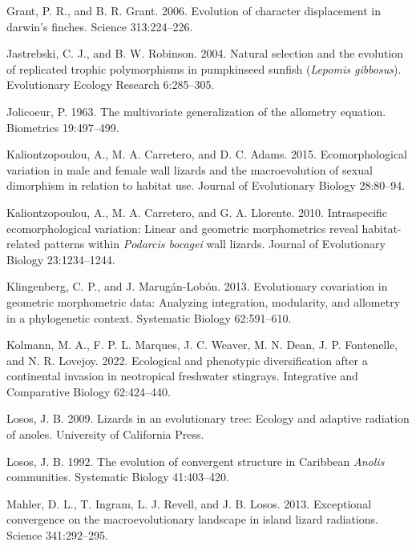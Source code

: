\documentclass[
  11pt,
]{article}
\newlength{\cslhangindent}
\newlength{\cslentryspacingunit} %
\newenvironment{CSLReferences}[2] %
 {%
  \setlength{\parindent}{0pt}
  \ifodd #1
  \let\oldpar\par
  \def\par{\hangindent=\cslhangindent\oldpar}
  \fi
  \setlength{\parskip}{#2\cslentryspacingunit}
 }%
 {}
\begin{document}
\begin{CSLReferences}{1}{0}
\leavevmode{}%
Grant, P. R., and B. R. Grant. 2006. Evolution of character displacement
in darwin's finches. Science 313:224--226.

\leavevmode{}%
Jastrebski, C. J., and B. W. Robinson. 2004. Natural selection and the
evolution of replicated trophic polymorphisms in pumpkinseed sunfish
(\emph{{L}epomis gibbosus}). Evolutionary Ecology Research 6:285--305.

\leavevmode{}%
Jolicoeur, P. 1963. The multivariate generalization of the allometry
equation. Biometrics 19:497--499.

\leavevmode{}%
Kaliontzopoulou, A., M. A. Carretero, and D. C. Adams. 2015.
Ecomorphological variation in male and female wall lizards and the
macroevolution of sexual dimorphism in relation to habitat use. Journal
of Evolutionary Biology 28:80--94.

\leavevmode{}%
Kaliontzopoulou, A., M. A. Carretero, and G. A. Llorente. 2010.
Intraspecific ecomorphological variation: Linear and geometric
morphometrics reveal habitat-related patterns within \emph{{P}odarcis
bocagei} wall lizards. Journal of Evolutionary Biology 23:1234--1244.

\leavevmode{}%
Klingenberg, C. P., and J. Marugán-Lobón. 2013. Evolutionary covariation
in geometric morphometric data: Analyzing integration, modularity, and
allometry in a phylogenetic context. Systematic Biology 62:591--610.

\leavevmode{}%
Kolmann, M. A., F. P. L. Marques, J. C. Weaver, M. N. Dean, J. P.
Fontenelle, and N. R. Lovejoy. 2022. Ecological and phenotypic
diversification after a continental invasion in neotropical freshwater
stingrays. Integrative and Comparative Biology 62:424--440.

\leavevmode{}%
Losos, J. B. 2009. Lizards in an evolutionary tree: Ecology and adaptive
radiation of anoles. University of California Press.

\leavevmode{}%
Losos, J. B. 1992. The evolution of convergent structure in {C}aribbean
\emph{{A}nolis} communities. Systematic Biology 41:403--420.

\leavevmode{}%
Mahler, D. L., T. Ingram, L. J. Revell, and J. B. Losos. 2013.
Exceptional convergence on the macroevolutionary landscape in island
lizard radiations. Science 341:292--295.


\end{CSLReferences}
\end{document}
